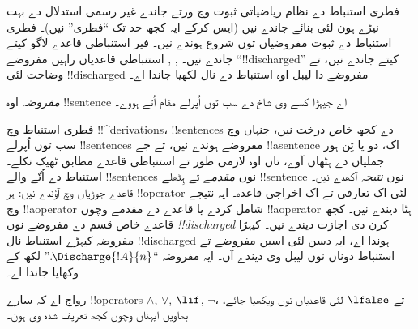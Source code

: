 \documentclass[../../../include/open-logic-section]{subfiles}
\begin{document}
      {}
      {}


\begin{explain}
فطری استنباط دے نظام ریاضیاتی ثبوت وچ ورتے جاندے غیر رسمی استدلال دے
بہت نیڑے ہون لئی بنائے جاندے نیں (ایس کرکے ایہ کجھ حد تک
``فطری'' نیں)۔ فطری استنباط دے ثبوت مفروضیاں توں شروع ہوندے نیں۔
فیر استنباطی قاعدے لاگو کیتے جاندے نیں۔ \Intro{\lnot}, \Intro{\lif},
 استنباطی قاعدیاں راہیں مفروضے
``!!{discharged}'' کیتے جاندے نیں، تے وضاحت لئی !!{discharged}
مفروضے دا لیبل اوہ استنباط دے نال لکھیا جاندا اے۔
\end{explain}

\begin{defn}[مفروضہ]
\emph{مفروضہ} اوہ !!{sentence} اے جیہڑا کسے وی شاخ دے سب توں اُپرلے
مقام اُتے ہووے۔
\end{defn}

فطری استنباط وچ !!^{derivation}s، !!{sentence}s دے کجھ خاص درخت نیں،
جنہاں وچ سب توں اُپرلے !!{sentence}s مفروضے ہوندے نیں، تے جے
!!a{sentence} اک، دو یا تِن ہور جملیاں دے ہِٹھاں آوے، تاں اوہ لازمی طور
تے استنباطی قاعدے مطابق ٹھیک نکلے۔ استنباط دے اُتّے والے
!!{sentence}s نوں \emph{مقدمے} تے ہِٹھلے !!{sentence} نوں
\emph{نتیجہ} آکھدے نیں۔ قاعدے جوڑیاں وچ آؤندے نیں: ہر !!{operator}
لئی اک تعارفی تے اک اخراجی قاعدہ۔ ایہ نتیجے وچ !!a{operator} شامل
کردے یا قاعدے دے مقدمے وچوں !!a{operator} ہٹا دیندے نیں۔ کجھ قاعدے
خاص قسم دے مفروضے نوں \emph{!!{discharged}} کرن دی اجازت دیندے نیں۔
کیہڑا مفروضہ کیہڑے استنباط نال !!{discharged} ہوندا اے، ایہ دسن لئی
اسیں مفروضے تے استنباط دوناں نوں لیبل وی دیندے آں۔ ایہ مفروضہ
``$\Discharge{!A}{n}$.'' لکھ کے وکھایا جاندا اے۔


%
	{رواج اے کہ سارے !!{operator}s $\land$, $\lor$, $\lif$, $\lnot$، تے $\lfalse$ لئی قاعدیاں نوں ویکھیا جائے، بھاویں ایہناں وچوں کجھ تعریف شدہ وی ہون۔}
\end{document}
